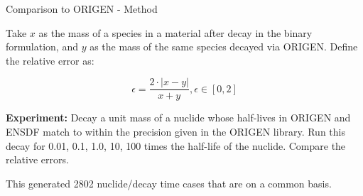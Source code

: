 \documentclass[xcolor=x11names,compress]{beamer}
\begin{document}
\begin{frame}{Comparison to ORIGEN - Method}

    Take $x$ as the mass of a species in a material 
    after decay in the binary formulation, and $y$ as the mass of the 
    same species decayed via ORIGEN. Define the relative error as:

    \vspace*{1em}
    \begin{equation}
    \epsilon = \frac{2 \cdot |x - y|}{x + y}, \epsilon \in [0, 2]
    \end{equation}

    \vspace*{1em}
    \textbf{Experiment:} Decay a unit mass of a nuclide whose half-lives 
    in ORIGEN and ENSDF match to within the precision given in the ORIGEN 
    library. Run this decay  for 0.01, 0.1, 1.0, 10, 100 times the half-life 
    of the nuclide. Compare the relative errors.

    \vspace*{1em}
    This generated 2802 nuclide/decay time cases that are on a common basis.

\end{frame}

\end{document}
